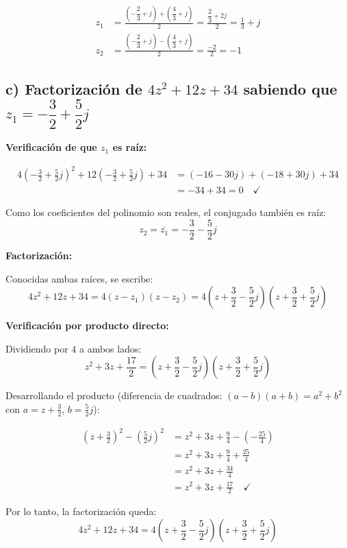 \documentclass[12pt,a4paper]{article}
\begin{document}
\begin{align*}
    z_1 &= \frac{\left(-\dfrac{2}{3}+j\right) + \left(\dfrac{4}{3}+j\right)}{2}
          = \frac{\dfrac{2}{3}+2j}{2}
          = \frac{1}{3} + j \\[10pt]
    z_2 &= \frac{\left(-\dfrac{2}{3}+j\right) - \left(\dfrac{4}{3}+j\right)}{2}
          = \frac{-2}{2}
          = -1
\end{align*}
\subsection {c) Factorización de $4z^2 + 12z + 34$ sabiendo que $z_1 = -\dfrac{3}{2} + \dfrac{5}{2}j$}

\textbf{Verificación de que $z_1$ es raíz:}

\begin{align*}
    4\left(-\frac{3}{2} + \frac{5}{2}j\right)^2 
    + 12\left(-\frac{3}{2} + \frac{5}{2}j\right) 
    + 34 
    &= (-16 - 30j) + (-18 + 30j) + 34 \\
    &= -34 + 34 = 0 \quad \checkmark
\end{align*}

Como los coeficientes del polinomio son reales, el conjugado también es raíz:
\[
    z_2 = \overline{z_1} = -\frac{3}{2} - \frac{5}{2}j
\]

\textbf{Factorización:}

Conocidas ambas raíces, se escribe:
\[
    4z^2 + 12z + 34 
    = 4\left(z - z_1\right)\left(z - z_2\right)
    = 4\left(z + \frac{3}{2} - \frac{5}{2}j\right)\left(z + \frac{3}{2} + \frac{5}{2}j\right)
\]

\textbf{Verificación por producto directo:}

Dividiendo por $4$ a ambos lados:
\[
    z^2 + 3z + \frac{17}{2} 
    = \left(z + \frac{3}{2} - \frac{5}{2}j\right)\left(z + \frac{3}{2} + \frac{5}{2}j\right)
\]

Desarrollando el producto (diferencia de cuadrados: $(a-b)(a+b) = a^2 + b^2$ con $a = z + \tfrac{3}{2}$, $b = \tfrac{5}{2}j$):

\begin{align*}
    \left(z + \frac{3}{2}\right)^2 - \left(\frac{5}{2}j\right)^2
    &= z^2 + 3z + \frac{9}{4} - \left(-\frac{25}{4}\right) \\
    &= z^2 + 3z + \frac{9}{4} + \frac{25}{4} \\
    &= z^2 + 3z + \frac{34}{4} \\
    &= z^2 + 3z + \frac{17}{2} \quad \checkmark
\end{align*}

Por lo tanto, la factorización queda:
\[
    \boxed{4z^2 + 12z + 34 = 4\left(z + \frac{3}{2} - \frac{5}{2}j\right)\left(z + \frac{3}{2} + \frac{5}{2}j\right)}
\]


\end{document}
